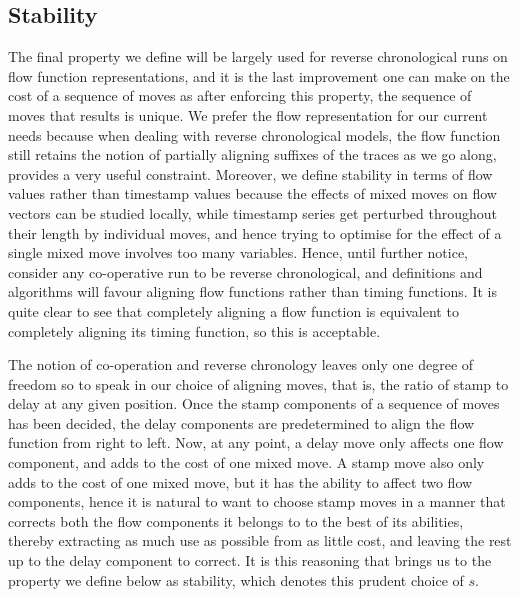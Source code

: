 \documentclass[conference]{IEEEtran}
\begin{document}
	\subsection{Stability}
	
	The final property we define will be largely used for reverse chronological runs on flow function representations, and it is the last improvement one can make on the cost of a sequence of moves as after enforcing this property, the sequence of moves that results is unique. 
	We prefer the flow representation for our current needs because when dealing with reverse chronological models, the flow function still retains the notion of partially aligning suffixes of the traces as we go along, provides a very useful constraint. 
	Moreover, we define stability in terms of flow values rather than timestamp values because the effects of mixed moves on flow vectors can be studied locally, while timestamp series get perturbed throughout their length by individual moves, and hence trying to optimise for the effect of a single mixed move involves too many variables. 
	Hence, until further notice, consider any co-operative run to be reverse chronological, and definitions and algorithms will favour aligning flow functions rather than timing functions. 
	It is quite clear to see that completely aligning a flow function is equivalent to completely aligning its timing function, so this is acceptable. 
	
	The notion of co-operation and reverse chronology leaves only one degree of freedom so to speak in our choice of aligning moves, that is, the ratio of stamp to delay at any given position. Once the stamp components of a sequence of moves has been decided, the delay components are predetermined to align the flow function from right to left. 
	Now, at any point, a delay move only affects one flow component, and adds to the cost of one mixed move.
	A stamp move also only adds to the cost of one mixed move, but it has the ability to affect two flow components, hence it is natural to want to choose stamp moves in a manner that corrects both the flow components it belongs to to the best of its abilities, thereby extracting as much use as possible from as little cost, and leaving the rest up to the delay component to correct. 
	It is this reasoning that brings us to the property we define below as stability, which denotes this prudent choice of $s$. 
	
\end{document}
